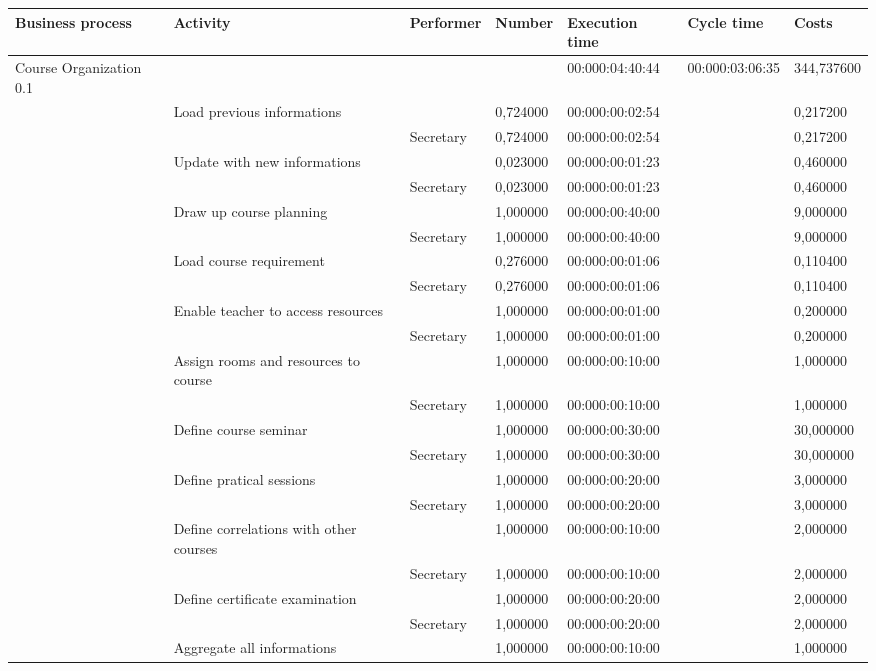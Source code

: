 \begin{landscape}
\centering
\begin{table}
{\tiny
\begin{tabular}{|l|l|l|l|l|l|l|}
Business process&Activity&Performer&Number&Execution time&Cycle
time&Costs\\
\hline
Course Organization 0.1&&&&00:000:04:40:44&00:000:03:06:35&344,737600\\
\hline
&Load previous informations &&0,724000&00:000:00:02:54&&0,217200\\
\hline
&&Secretary &0,724000&00:000:00:02:54&&0,217200\\
\hline
&Update with new informations &&0,023000&00:000:00:01:23&&0,460000\\
\hline
&&Secretary &0,023000&00:000:00:01:23&&0,460000\\
\hline
&Draw up course planning &&1,000000&00:000:00:40:00&&9,000000\\
\hline
&&Secretary &1,000000&00:000:00:40:00&&9,000000\\
\hline
&Load course requirement &&0,276000&00:000:00:01:06&&0,110400\\
\hline
&&Secretary &0,276000&00:000:00:01:06&&0,110400\\
\hline
&Enable teacher to access resources &&1,000000&00:000:00:01:00&&0,200000\\
\hline
&&Secretary &1,000000&00:000:00:01:00&&0,200000\\
\hline
&Assign rooms and resources to course &&1,000000&00:000:00:10:00&&1,000000\\
\hline
&&Secretary &1,000000&00:000:00:10:00&&1,000000\\
\hline
&Define course seminar &&1,000000&00:000:00:30:00&&30,000000\\
\hline
&&Secretary &1,000000&00:000:00:30:00&&30,000000\\
\hline
&Define pratical sessions &&1,000000&00:000:00:20:00&&3,000000\\
\hline
&&Secretary &1,000000&00:000:00:20:00&&3,000000\\
\hline
&Define correlations with other courses &&1,000000&00:000:00:10:00&&2,000000\\
\hline
&&Secretary &1,000000&00:000:00:10:00&&2,000000\\
\hline
&Define certificate examination &&1,000000&00:000:00:20:00&&2,000000\\
\hline
&&Secretary &1,000000&00:000:00:20:00&&2,000000\\
\hline
&Aggregate all informations &&1,000000&00:000:00:10:00&&1,000000\\

\end{tabular}}
\end{table}
\end{landscape}
